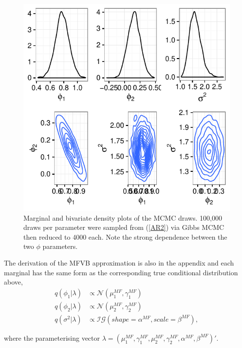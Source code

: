 \documentclass{article}\usepackage[]{graphicx}\usepackage[]{color}
\makeatletter
\def\maxwidth{ %
  \ifdim\Gin@nat@width>\linewidth
    \linewidth
  \else
    \Gin@nat@width
  \fi
}
\newenvironment{knitrout}{}{} %
\numberwithin{equation}{section}
\makeatother
\begin{document}
\begin{figure}
\label{AR2MCMC}
\centering
\begin{knitrout}
\color{fgcolor}
\includegraphics[width=\maxwidth]{figure/AR2MCMC-1} 

\end{knitrout}
\caption{Marginal and bivariate density plots of the MCMC draws. 100,000 draws per parameter were sampled from (\ref{AR2}) via Gibbs MCMC then reduced to 4000 each. Note the strong dependence between the two $\phi$ parameters.}
\end{figure}

The derivation of the MFVB approximation is also in the appendix and each marginal has the same form as the corresponding true conditional distribution above,
\begin{align}
q(\phi_1 | \lambda) &\propto \mathcal{N}(\mu_1^{MF}, \gamma_1^{MF}) \nonumber \\
q(\phi_2 | \lambda) &\propto \mathcal{N}(\mu_2^{MF}, \gamma_2^{MF}) \nonumber \\
q(\sigma^2 | \lambda) &\propto \mathcal{IG}(shape = \alpha^{MF},  scale = \beta^{MF}), \nonumber
\end{align}

where the parameterising vector $\lambda = (\mu_1^{MF}, \gamma_1^{MF}, \mu_2^{MF}, \gamma_2^{MF}, \alpha^{MF}, \beta^{MF})'$.
\end{document}
